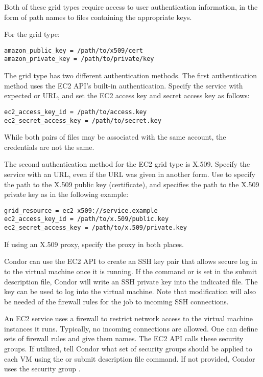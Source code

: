 Both of these grid types require access to user authentication information,
in the form of path names to files containing the appropriate keys.

For the  grid type:
\begin{verbatim}
amazon_public_key = /path/to/x509/cert
amazon_private_key = /path/to/private/key
\end{verbatim}

The  grid type has two different authentication methods.
The first authentication method uses the EC2 API's built-in authentication.
Specify the service with expected  or  URL,
and set the EC2 access key and secret access key as follows:

\begin{verbatim}
ec2_access_key_id = /path/to/access.key
ec2_secret_access_key = /path/to/secret.key
\end{verbatim}

While both pairs of files may be associated with the same account, 
the credentials are not the same.

The second authentication method for the EC2 grid type is X.509.
Specify the service with an  URL, 
even if the URL was given in another form.  
Use  to 
specify the path to the X.509 public key (certificate),
and  specifies the path to the X.509 
private key as in the following example:

\begin{verbatim}
grid_resource = ec2 x509://service.example
ec2_access_key_id = /path/to/x.509/public.key
ec2_secret_access_key = /path/to/x.509/private.key
\end{verbatim}

If using an X.509 proxy, specify the proxy in both places.

Condor can use the EC2 API to create an SSH key pair that allows
secure log in to the virtual machine once it is running.
If the command
or 
is set in the submit description file,
Condor will write an SSH private key into the indicated file.
The key can be used to log into the virtual machine.
Note that modification will also be needed of the firewall
rules for the job to incoming SSH connections.

An EC2 service uses a firewall to restrict network access to 
the virtual machine instances it runs.
Typically, no incoming connections are allowed.
One can define sets of firewall rules and give them names.
The EC2 API calls these security groups. 
If utilized, tell Condor what set of security
groups should be applied to each VM using the
or  submit description file command.
If not provided, Condor uses the security group .

